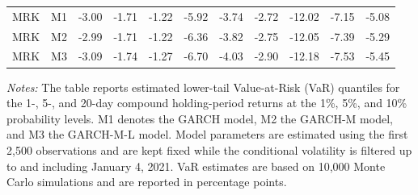 \documentclass[a4paper, 12pt]{article}
\theoremstyle{definition}
\begin{document}
\begin{table}[H]
\begin{tabular*}{\textwidth}{
    @{\extracolsep{\fill}}
    ll
    rrrrrrrrr
    }
        \addlinespace[0.8em]

        MRK & M1
        & -3.00 & -1.71 & -1.22
        & -5.92 & -3.74 & -2.72
        & -12.02 & -7.15 & -5.08
        \\

        MRK & M2
        & -2.99 & -1.71 & -1.22
        & -6.36 & -3.82 & -2.75
        & -12.05 & -7.39 & -5.29
        \\

        MRK & M3
        & -3.09 & -1.74 & -1.27
        & -6.70 & -4.03 & -2.90
        & -12.18 & -7.53 & -5.45
        \\

        \bottomrule
    \end{tabular*}

    \vspace{0.7em}

    \begin{minipage}{\textwidth}
        \footnotesize
        \textit{Notes:}
        The table reports estimated lower-tail Value-at-Risk (VaR) quantiles for the
        1-, 5-, and 20-day compound holding-period returns at the 1\%, 5\%, and 10\%
        probability levels. M1 denotes the GARCH model, M2 the GARCH-M model, and
        M3 the GARCH-M-L model. Model parameters are estimated using the first
        2,500 observations and are kept fixed while the conditional volatility is
        filtered up to and including January 4, 2021. VaR estimates are based on
        10,000 Monte Carlo simulations and are reported in percentage points.
    \end{minipage}

\end{table}
\end{document}
